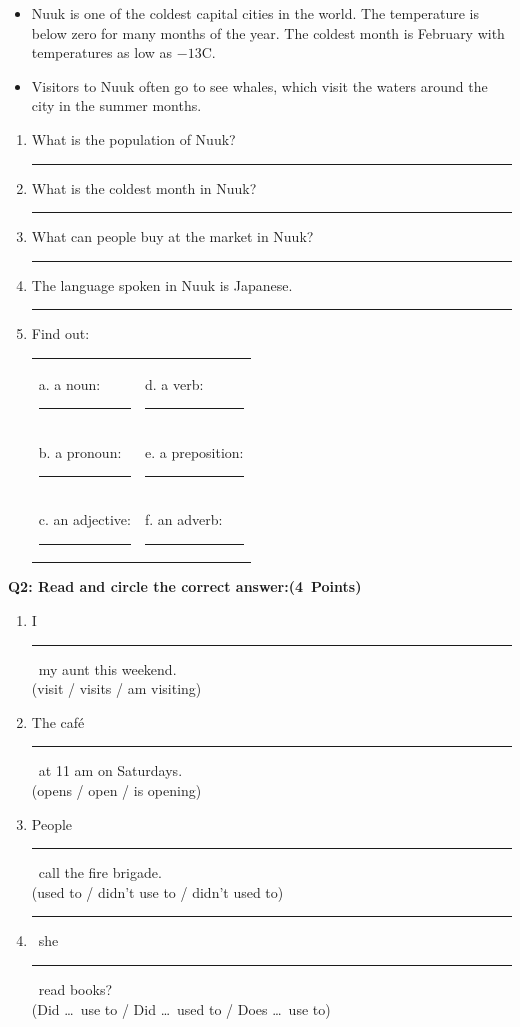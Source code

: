 \documentclass[12pt, a4paper]{article}
\newcommand{\ansline}{\par\vspace{0.45cm}\noindent\rule{\linewidth}{0.4pt}\par}
\newcommand{\blank}[1][3cm]{\rule{#1}{0.4pt}}
\newcommand{\question}[2]{\par\vspace{0.3cm}\noindent\textbf{\large #1}\hspace{0.4cm}\hfill\mbox{\textbf{(#2)}}\par\vspace{0.2cm}}
\begin{document}
\begin{center}
{{\vspace{0.2cm}
\linespread{1.15}\selectfont
\begin{itemize}[leftmargin=1.2em, itemsep=0.1cm, topsep=0pt]
\item Nuuk is one of the coldest capital cities in the world. The temperature is below zero for many months of the year. The coldest month is February with temperatures as low as $-13$\degree C.
\item Visitors to Nuuk often go to see whales, which visit the waters around the city in the summer months.
\end{itemize}
\vspace{0.1cm}
}}
\end{center}

\begin{enumerate}[label=\textbf{\arabic*.}, itemsep=0.2cm, leftmargin=*]
\item What is the population of Nuuk? \blank[6cm]

\item What is the coldest month in Nuuk? \blank[6cm]

\item What can people buy at the market in Nuuk?
\ansline

\item The language spoken in Nuuk is Japanese. \blank[6cm]

\item Find out:
\vspace{0.3cm}

\noindent\begin{tabularx}{\linewidth}{@{}XX@{}}
a. a noun: \blank[4.2cm]        & d. a verb: \blank[4.2cm] \\[0.35cm]
b. a pronoun: \blank[4.2cm]     & e. a preposition: \blank[4.2cm] \\[0.35cm]
c. an adjective: \blank[4.2cm]  & f. an adverb: \blank[4.2cm]
\end{tabularx}
\end{enumerate}
\endgroup

\newpage
\question{Q2: Read and circle the correct answer:}{4 Points}

\begin{enumerate}[label=\textbf{\arabic*.}, itemsep=0.4cm, leftmargin=*]
\item I \blank\ my aunt this weekend. \\
(visit / visits / am visiting)

\item The caf\'e \blank\ at 11 am on Saturdays. \\
(opens / open / is opening)

\item People \blank\ call the fire brigade. \\
(used to / didn't use to / didn't used to)

\item \blank\ she \blank\ read books? \\
(Did \ldots\ use to / Did \ldots\ used to / Does \ldots\ use to)
\end{enumerate}
\end{document}
